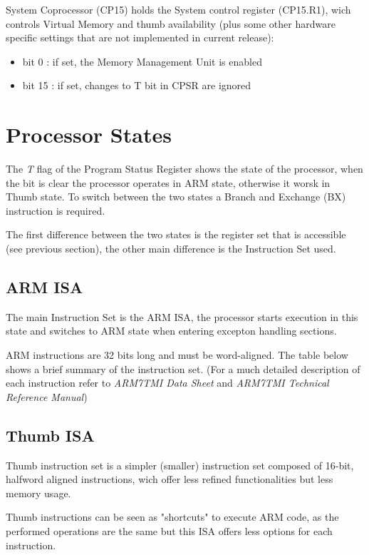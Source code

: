 System Coprocessor (CP15) holds the System control register (CP15.R1), wich controls Virtual Memory and thumb availability (plus some other hardware specific settings that are not implemented in current release):

\begin{itemize}
\item bit 0 : if set, the Memory Management Unit is enabled
\item bit 15 : if set, changes to T bit in CPSR are ignored
\end{itemize}

\section{Processor States}

The \emph{T} flag of the Program Status Register shows the state of the processor, when the bit is clear the processor operates in ARM state, otherwise it worsk in Thumb state. To switch between the two states a Branch and Exchange (BX) instruction is required.

The first difference between the two states is the register set that is accessible (see previous section), the other main difference is the Instruction Set used.

\subsection{ARM ISA}

The main Instruction Set is the ARM ISA, the processor starts execution in this state and switches to ARM state when entering excepton handling sections.

ARM instructions are 32 bits long and must be word-aligned. The table below shows a brief summary of the instruction set. (For a much detailed description of each instruction refer to \emph{ARM7TMI Data Sheet} and \emph{ARM7TMI Technical Reference Manual})



\subsection{Thumb ISA}

Thumb instruction set is a simpler (smaller) instruction set composed of 16-bit, halfword aligned instructions, wich offer less refined functionalities but less memory usage.

Thumb instructions can be seen as "shortcuts" to execute ARM code, as the performed operations are the same but this ISA offers less options for each instruction.

